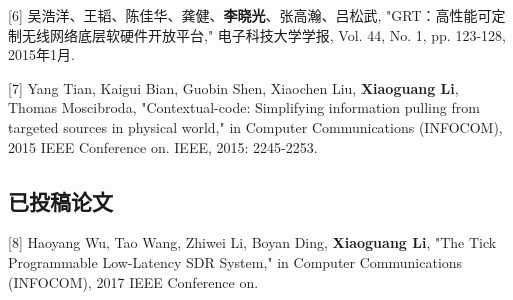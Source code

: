 \begin{description}
		\item{[6]} 吴浩洋、王韬、陈佳华、龚健、\textbf{李晓光}、张高瀚、吕松武, "GRT：高性能可定制无线网络底层软硬件开放平台," 电子科技大学学报, Vol. 44, No. 1, pp. 123-128, 2015年1月.

		\item{[7]} Yang Tian, Kaigui Bian, Guobin Shen, Xiaochen Liu, \textbf{Xiaoguang Li}, Thomas Moscibroda, "Contextual-code: Simplifying information pulling from targeted sources in physical world," in Computer Communications (INFOCOM), 2015 IEEE Conference on. IEEE, 2015: 2245-2253.
		\subsection*{已投稿论文}
		\item{[8]} Haoyang Wu, Tao Wang, Zhiwei Li, Boyan Ding, \textbf{Xiaoguang Li}, "The Tick Programmable Low-Latency SDR System," in Computer Communications (INFOCOM), 2017 IEEE Conference on.

	\end{description}

\flushbottom %
